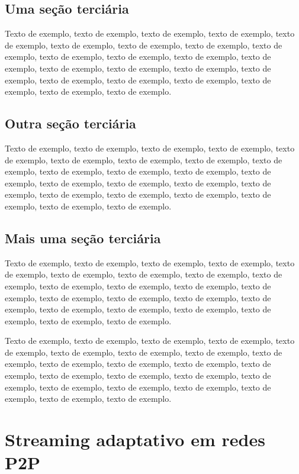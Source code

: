 \documentclass[
	12pt,				%
	oneside,			%
	a4paper,			%
	english,			%
	brazil				%
	]{abntex2ppgsi}
\begin{document}
\subsection{Uma seção terciária}

Texto de exemplo, texto de exemplo, texto de exemplo, texto de exemplo, texto de exemplo, texto de exemplo, texto de exemplo, texto de exemplo, texto de exemplo, texto de exemplo, texto de exemplo, texto de exemplo, texto de exemplo, texto de exemplo, texto de exemplo, texto de exemplo, texto de exemplo, texto de exemplo, texto de exemplo, texto de exemplo, texto de exemplo, texto de exemplo, texto de exemplo.


\subsection{Outra seção terciária}

Texto de exemplo, texto de exemplo, texto de exemplo, texto de exemplo, texto de exemplo, texto de exemplo, texto de exemplo, texto de exemplo, texto de exemplo, texto de exemplo, texto de exemplo, texto de exemplo, texto de exemplo, texto de exemplo, texto de exemplo, texto de exemplo, texto de exemplo, texto de exemplo, texto de exemplo, texto de exemplo, texto de exemplo, texto de exemplo, texto de exemplo.

\subsection{Mais uma seção terciária}

Texto de exemplo, texto de exemplo, texto de exemplo, texto de exemplo, texto de exemplo, texto de exemplo, texto de exemplo, texto de exemplo, texto de exemplo, texto de exemplo, texto de exemplo, texto de exemplo, texto de exemplo, texto de exemplo, texto de exemplo, texto de exemplo, texto de exemplo, texto de exemplo, texto de exemplo, texto de exemplo, texto de exemplo, texto de exemplo, texto de exemplo.

Texto de exemplo, texto de exemplo, texto de exemplo, texto de exemplo, texto de exemplo, texto de exemplo, texto de exemplo, texto de exemplo, texto de exemplo, texto de exemplo, texto de exemplo, texto de exemplo, texto de exemplo, texto de exemplo, texto de exemplo, texto de exemplo, texto de exemplo, texto de exemplo, texto de exemplo, texto de exemplo, texto de exemplo, texto de exemplo, texto de exemplo.

\section{Streaming adaptativo em redes P2P}
\end{document}
